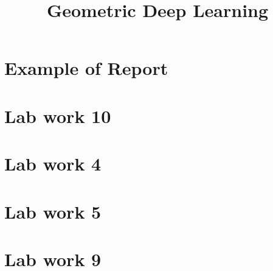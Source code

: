 \documentclass[a4paper,14pt]{article}
\title{Geometric Deep Learning}
\date{}
\numberwithin{equation}{section}
\begin{document}
    \maketitle
    \tableofcontents

    \clearpage
    \section{Example of Report} %
    {} %

    \clearpage
    \section{Lab work 10} %
    {} %

    \clearpage
    \section{Lab work 4} %
    {} %

    \clearpage
    \section{Lab work 5} %
    {} %

    \clearpage
    \section{Lab work 9} %
    {} %

    \clearpage
    \printbibliography
\end{document}
